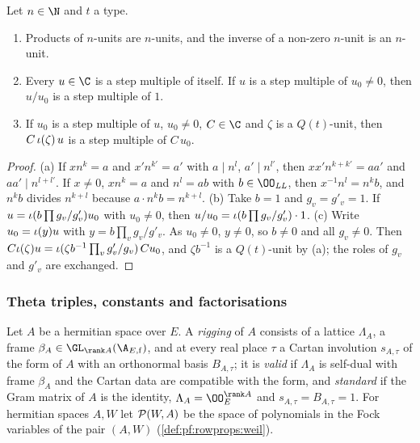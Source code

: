 \begin{lemma}\label{pf:sh-theta:unitlemma}
Let $n\in\N$ and $t$ a type.
\begin{enumerate}[label=(\alph*)]
\item Products of $n$-units are $n$-units, and the inverse of a non-zero $n$-unit is an $n$-unit.
\item Every $u\in\C$ is a step multiple of itself. If $u$ is a step multiple of $u_0\ne0$, then $u/u_0$ is a step
multiple of $1$.
\item If $u_0$ is a step multiple of $u$, $u_0\ne0$, $C\in\C$ and $\zeta$ is a $Q(t)$-unit, then $C\,\iota(\zeta)\,u$
is a step multiple of $C\,u_0$.
\end{enumerate}
\end{lemma}

\begin{proof}
(a) If $xn^k=a$ and $x'n^{k'}=a'$ with $a\mid n^l$, $a'\mid n^{l'}$, then $xx'n^{k+k'}=aa'$ and $aa'\mid n^{l+l'}$. If
$x\ne0$, $xn^k=a$ and $n^l=ab$ with $b\in\OO_{\shthetaLL}$, then $x^{-1}n^l=n^kb$, and $n^kb$ divides $n^{k+l}$ because
$a\cdot n^kb=n^{k+l}$.
(b) Take $b=1$ and $g_v=g'_v=1$. If $u=\iota(b\prod g_v/g'_v)u_0$ with $u_0\ne0$, then
$u/u_0=\iota(b\prod g_v/g'_v)\cdot1$.
(c) Write $u_0=\iota(y)u$ with $y=b\prod_vg_v/g'_v$. As $u_0\ne0$, $y\ne0$, so $b\ne0$ and all $g_v\ne0$. Then
$C\iota(\zeta)u=\iota(\zeta b^{-1}\prod_vg'_v/g_v)\,Cu_0$, and $\zeta b^{-1}$ is a $Q(t)$-unit by (a);
the roles of $g_v$ and $g'_v$ are exchanged.
\end{proof}

\subsubsection{Theta triples, constants and factorisations}

Let $A$ be a hermitian space over $E$. A \emph{rigging} of $A$ consists of a lattice $\Lambda_A$, a frame
$\beta_A\in\GL_{\rank A}(\A_{E,\mathrm f})$, and at every real place $\tau$ a Cartan involution $s_{A,\tau}$ of the form
of $A$ with an orthonormal basis $B_{A,\tau}$; it is \emph{valid} if $\Lambda_A$ is self-dual with frame $\beta_A$ and
the Cartan data are compatible with the form, and \emph{standard} if the Gram matrix of $A$ is the identity,
$\Lambda_A=\OO_E^{\rank A}$ and $s_{A,\tau}=B_{A,\tau}=1$. For hermitian spaces $A,W$ let $\mathcal{P}(W,A)$ be the
space of polynomials in the Fock variables of the pair $(A,W)$ (\cref{def:pf:rowprops:weil}).


